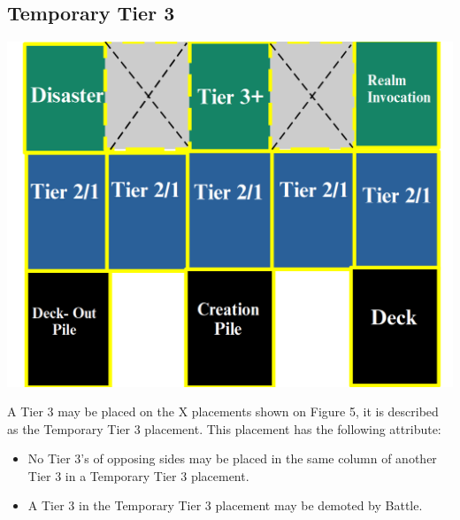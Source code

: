 \subsection{Temporary Tier 3}
\begin{center}
    \includegraphics[scale=0.25]{images/FV3.4.png}
\end{center}
A Tier 3 may be placed on the X placements shown on Figure 5, it is described as the 
Temporary Tier 3 placement. This placement has the following attribute:

\begin{itemize}
    \item No Tier 3's of opposing sides may be placed in the same column of another Tier 3 in a Temporary Tier 3 placement. 
    \item A Tier 3 in the Temporary Tier 3 placement may be demoted by Battle. 
\end{itemize}


